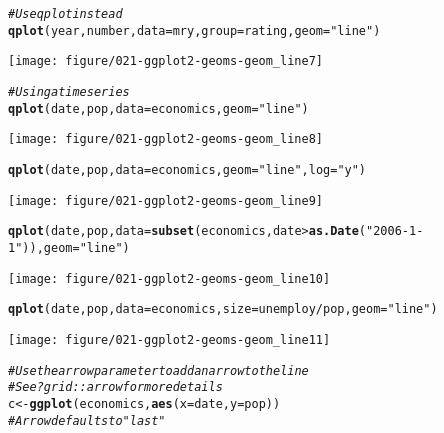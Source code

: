 \documentclass[a4paper,titlepage]{tufte-handout}\usepackage[]{graphicx}\usepackage[]{color}
\makeatletter
\def\maxwidth{ %
  \ifdim\Gin@nat@width>\linewidth
    \linewidth
  \else
    \Gin@nat@width
  \fi
}
\newcommand{\hlstr}[1]{\textcolor[rgb]{0.192,0.494,0.8}{#1}}%
\newcommand{\hlcom}[1]{\textcolor[rgb]{0.678,0.584,0.686}{\textit{#1}}}%
\newcommand{\hlopt}[1]{\textcolor[rgb]{0,0,0}{#1}}%
\newcommand{\hlstd}[1]{\textcolor[rgb]{0.345,0.345,0.345}{#1}}%
\newcommand{\hlkwb}[1]{\textcolor[rgb]{0.69,0.353,0.396}{#1}}%
\newcommand{\hlkwc}[1]{\textcolor[rgb]{0.333,0.667,0.333}{#1}}%
\newcommand{\hlkwd}[1]{\textcolor[rgb]{0.737,0.353,0.396}{\textbf{#1}}}%
\newenvironment{kframe}{%
 \def\at@end@of@kframe{}%
 \ifinner\ifhmode%
  \def\at@end@of@kframe{\end{minipage}}%
  \begin{minipage}{\columnwidth}%
 \fi\fi%
 \def\FrameCommand##1{\hskip\@totalleftmargin \hskip-\fboxsep
 \colorbox{shadecolor}{##1}\hskip-\fboxsep
     \hskip-\linewidth \hskip-\@totalleftmargin \hskip\columnwidth}%
 \MakeFramed {\advance\hsize-\width
   \@totalleftmargin\z@ \linewidth\hsize
   \@setminipage}}%
 {\par\unskip\endMakeFramed%
 \at@end@of@kframe}
\newenvironment{knitrout}{}{} %
\makeatother
\begin{document}
\begin{knitrout}
\begin{kframe}\begin{alltt}
\hlcom{# Use qplot instead}
\hlkwd{qplot}\hlstd{(year, number,} \hlkwc{data}\hlstd{=mry,} \hlkwc{group}\hlstd{=rating,} \hlkwc{geom}\hlstd{=}\hlstr{"line"}\hlstd{)}
\end{alltt}
\end{kframe}
\texttt{[image: figure/021-ggplot2-geoms-geom\_line7]} 
\begin{kframe}\begin{alltt}
\hlcom{# Using a time series}
\hlkwd{qplot}\hlstd{(date, pop,} \hlkwc{data}\hlstd{=economics,} \hlkwc{geom}\hlstd{=}\hlstr{"line"}\hlstd{)}
\end{alltt}
\end{kframe}
\texttt{[image: figure/021-ggplot2-geoms-geom\_line8]} 
\begin{kframe}\begin{alltt}
\hlkwd{qplot}\hlstd{(date, pop,} \hlkwc{data}\hlstd{=economics,} \hlkwc{geom}\hlstd{=}\hlstr{"line"}\hlstd{,} \hlkwc{log}\hlstd{=}\hlstr{"y"}\hlstd{)}
\end{alltt}
\end{kframe}
\texttt{[image: figure/021-ggplot2-geoms-geom\_line9]} 
\begin{kframe}\begin{alltt}
\hlkwd{qplot}\hlstd{(date, pop,} \hlkwc{data}\hlstd{=}\hlkwd{subset}\hlstd{(economics, date} \hlopt{>} \hlkwd{as.Date}\hlstd{(}\hlstr{"2006-1-1"}\hlstd{)),} \hlkwc{geom}\hlstd{=}\hlstr{"line"}\hlstd{)}
\end{alltt}
\end{kframe}
\texttt{[image: figure/021-ggplot2-geoms-geom\_line10]} 
\begin{kframe}\begin{alltt}
\hlkwd{qplot}\hlstd{(date, pop,} \hlkwc{data}\hlstd{=economics,} \hlkwc{size}\hlstd{=unemploy}\hlopt{/}\hlstd{pop,} \hlkwc{geom}\hlstd{=}\hlstr{"line"}\hlstd{)}
\end{alltt}
\end{kframe}
\texttt{[image: figure/021-ggplot2-geoms-geom\_line11]} 
\begin{kframe}\begin{alltt}
\hlcom{# Use the arrow parameter to add an arrow to the line}
\hlcom{# See ?grid::arrow for more details}
\hlstd{c} \hlkwb{<-} \hlkwd{ggplot}\hlstd{(economics,} \hlkwd{aes}\hlstd{(}\hlkwc{x} \hlstd{= date,} \hlkwc{y} \hlstd{= pop))}
\hlcom{# Arrow defaults to "last"}

\end{alltt}
\end{kframe}
\end{knitrout}
\end{document}
